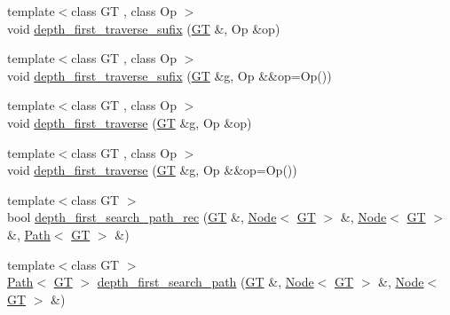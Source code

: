 \begin{DoxyCompactItemize}
\item 
{\footnotesize template$<$class GT , class Op $>$ }\\void \hyperlink{namespace_designar_a91a3b6c7321dec6f2d9579721af465a1}{depth\+\_\+first\+\_\+traverse\+\_\+sufix} (\hyperlink{demo-buildgraph_8_c_a3001c40d2c31ca87ed96cd7d1334a55e}{GT} \&, Op \&op)
\item 
{\footnotesize template$<$class GT , class Op $>$ }\\void \hyperlink{namespace_designar_ae742525c8bae623299150bcbcc317d6c}{depth\+\_\+first\+\_\+traverse\+\_\+sufix} (\hyperlink{demo-buildgraph_8_c_a3001c40d2c31ca87ed96cd7d1334a55e}{GT} \&g, Op \&\&op=Op())
\item 
{\footnotesize template$<$class GT , class Op $>$ }\\void \hyperlink{namespace_designar_a259944a482130c7a304058ed801872a9}{depth\+\_\+first\+\_\+traverse} (\hyperlink{demo-buildgraph_8_c_a3001c40d2c31ca87ed96cd7d1334a55e}{GT} \&g, Op \&op)
\item 
{\footnotesize template$<$class GT , class Op $>$ }\\void \hyperlink{namespace_designar_a40329a328d24d8ac25f540902fb69159}{depth\+\_\+first\+\_\+traverse} (\hyperlink{demo-buildgraph_8_c_a3001c40d2c31ca87ed96cd7d1334a55e}{GT} \&g, Op \&\&op=Op())
\item 
{\footnotesize template$<$class GT $>$ }\\bool \hyperlink{namespace_designar_a0a2a9a44cfea24efc22cab8b8a9d2acd}{depth\+\_\+first\+\_\+search\+\_\+path\+\_\+rec} (\hyperlink{demo-buildgraph_8_c_a3001c40d2c31ca87ed96cd7d1334a55e}{GT} \&, \hyperlink{namespace_designar_a5af326c65aa2bd26b26c410f2030d09e}{Node}$<$ \hyperlink{demo-buildgraph_8_c_a3001c40d2c31ca87ed96cd7d1334a55e}{GT} $>$ \&, \hyperlink{namespace_designar_a5af326c65aa2bd26b26c410f2030d09e}{Node}$<$ \hyperlink{demo-buildgraph_8_c_a3001c40d2c31ca87ed96cd7d1334a55e}{GT} $>$ \&, \hyperlink{class_designar_1_1_path}{Path}$<$ \hyperlink{demo-buildgraph_8_c_a3001c40d2c31ca87ed96cd7d1334a55e}{GT} $>$ \&)
\item 
{\footnotesize template$<$class GT $>$ }\\\hyperlink{class_designar_1_1_path}{Path}$<$ \hyperlink{demo-buildgraph_8_c_a3001c40d2c31ca87ed96cd7d1334a55e}{GT} $>$ \hyperlink{namespace_designar_ab5b060dde0b717e9818c796da60b39b1}{depth\+\_\+first\+\_\+search\+\_\+path} (\hyperlink{demo-buildgraph_8_c_a3001c40d2c31ca87ed96cd7d1334a55e}{GT} \&, \hyperlink{namespace_designar_a5af326c65aa2bd26b26c410f2030d09e}{Node}$<$ \hyperlink{demo-buildgraph_8_c_a3001c40d2c31ca87ed96cd7d1334a55e}{GT} $>$ \&, \hyperlink{namespace_designar_a5af326c65aa2bd26b26c410f2030d09e}{Node}$<$ \hyperlink{demo-buildgraph_8_c_a3001c40d2c31ca87ed96cd7d1334a55e}{GT} $>$ \&)

\end{DoxyCompactItemize}
